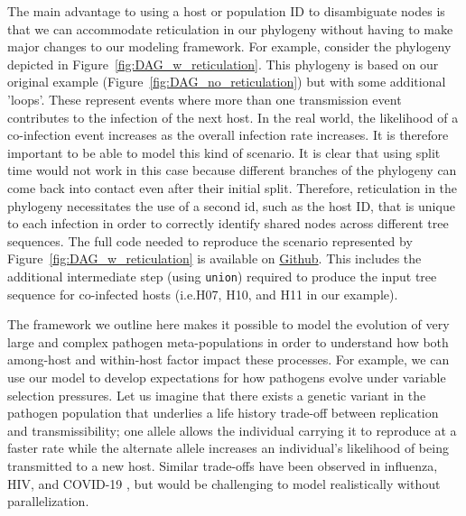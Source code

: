 \documentclass[12pt]{article}
\newcommand{\tskit}[0]{\texttt{tskit}\xspace}
\newcommand{\slim}[0]{\texttt{SLiM}\xspace}
\newcommand{\pyslim}[0]{\texttt{pyslim}\xspace}
\newcommand*{\ie}{i.e.\xcomma}
\begin{document}
The main advantage to using a host or population ID to disambiguate nodes is that we can accommodate reticulation in our phylogeny without having to make major
changes to our modeling framework. For example, consider the phylogeny depicted in Figure~\ref{fig:DAG_w_reticulation}. This phylogeny is based on our original example (Figure~\ref{fig:DAG_no_reticulation}) but with some
additional 'loops'. These represent events where more than one transmission event contributes to the infection of the next host. In the real world, the likelihood of a co-infection event
increases as the overall infection rate increases. It is therefore important to be able to model this kind of scenario. It is clear that using split time would not work in this case because
different branches of the phylogeny can come back into contact even after their initial split. Therefore, reticulation in the phylogeny necessitates the use of a second id, such as the host ID, that is unique to each infection in order to correctly identify shared nodes across different tree sequences. The full code needed to reproduce the scenario represented by Figure~\ref{fig:DAG_w_reticulation} is available on \href{https://github.com/petrelharp/pyslim_paper/tree/main/code/virus_example_w_reticulation}{Github}.
This includes the additional intermediate step (using \verb|union|)
required to produce the input tree sequence for co-infected hosts (\ie H07, H10, and H11 in our example). %

The framework we outline here makes it possible to model the evolution of very large and complex pathogen meta-populations in order to understand how both among-host
and within-host factor impact these processes. For example, we can use our model to develop expectations for how pathogens evolve under variable selection pressures. Let
us imagine that there exists a genetic variant in the pathogen population that underlies a life history trade-off between replication and transmissibility; one allele allows the
individual carrying it to reproduce at a faster rate while the alternate allele increases an individual's likelihood of being transmitted to a new host. Similar trade-offs have been observed in influenza, HIV, and COVID-19 \citep{liang2023pathogenicity, arien2005replicative, zhu2022ancestral}, but would be challenging to model realistically without parallelization. 
\end{document}
